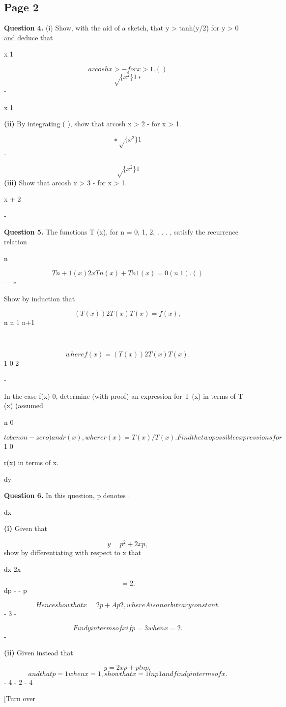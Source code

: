 \documentclass[12pt]{article}
\begin{document}
\subsection*{Page 2}
\begin{flushleft}
\bigskip\textbf{Question 4.} (i) Show, with the aid of a sketch, that y > tanh(y/2) for y > 0 and deduce that\par
x 1\par
\[arcosh x > - for x > 1. ( )\]
\[\sqrt\{x^2\} 1 ∗\]
-\par
x 1\par
\textbf{(ii)} By integrating ( ), show that arcosh x > 2 - for x > 1.\par
\[∗ \sqrt\{x^2\} 1\]
-\par
\[\sqrt\{x^2\} 1\]
\textbf{(iii)} Show that arcosh x > 3 - for x > 1.\par
x + 2\par
[Note: arcosh x is another notation for cosh 1 x. ]\par
-\par
\bigskip\textbf{Question 5.} The functions T (x), for n = 0, 1, 2, . . . , satisfy the recurrence relation\par
n\par
\[T n+1 (x) 2xT n (x) + T n 1 (x) = 0 (n  1). ( )\]
- - ∗\par
Show by induction that\par
\[(T (x))2 T (x)T (x) = f(x) ,\]
n n 1 n+1\par
- -\par
\[where f(x) = (T (x))2 T (x)T (x) .\]
1 0 2\par
-\par
In the case f(x) 0, determine (with proof) an expression for T (x) in terms of T (x) (assumed\par
n 0\par
\equiv\par
\[to be non-zero) and r(x), where r(x) = T (x)/T (x). Find the two possible expressions for\]
1 0\par
r(x) in terms of x.\par
dy\par
\bigskip\textbf{Question 6.} In this question, p denotes .\par
dx\par
\textbf{(i)} Given that\par
\[y = p^2 + 2xp ,\]
show by differentiating with respect to x that\par
dx 2x\par
\[= 2 .\]
dp - - p\par
\[Hence show that x = 2 p + Ap 2 , where A is an arbitrary constant.\]
- 3 -\par
\[Find y in terms of x if p = 3 when x = 2.\]
-\par
\textbf{(ii)} Given instead that\par
\[y = 2xp + p ln p ,\]
\[and that p = 1 when x = 1 , show that x = 1 ln p 1 and find y in terms of x.\]
- 4 - 2 - 4\par
[Turn over\par
\end{flushleft}
\end{document}
